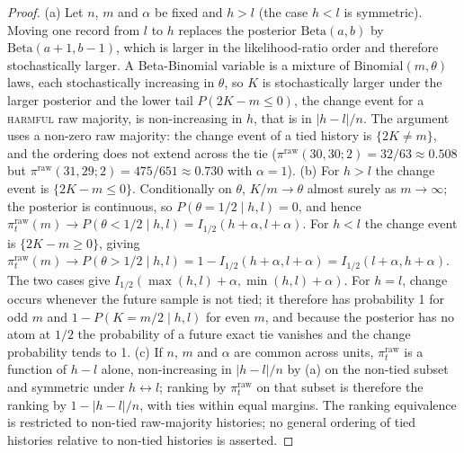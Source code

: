 \documentclass[11pt]{article}
\begin{document}
\begin{proof}
(a) Let $n$, $m$ and $\alpha$ be fixed and $h>l$ (the case $h<l$ is symmetric). Moving one record
from $l$ to $h$ replaces the posterior $\mathrm{Beta}(a,b)$ by $\mathrm{Beta}(a+1,b-1)$, which is
larger in the likelihood-ratio order and therefore stochastically larger. A Beta-Binomial
variable is a mixture of $\mathrm{Binomial}(m,\theta)$ laws, each stochastically increasing in
$\theta$, so $K$ is stochastically larger under the larger posterior and the lower tail
$P(2K-m\le0)$, the change event for a \textsc{harmful} raw majority, is non-increasing in $h$,
that is in $|h-l|/n$. The argument uses a non-zero raw majority: the change event of a tied history
is $\{2K\neq m\}$, and the ordering does not extend across the tie
($\pi^{\mathrm{raw}}(30,30;2)=32/63\approx0.508$ but $\pi^{\mathrm{raw}}(31,29;2)=475/651\approx0.730$
with $\alpha=1$).
(b) For $h>l$ the change event is $\{2K-m\le0\}$. Conditionally on $\theta$, $K/m\to\theta$ almost
surely as $m\to\infty$; the posterior is continuous, so $P(\theta=1/2\mid h,l)=0$, and hence
$\pi^{\mathrm{raw}}_t(m)\to P(\theta<1/2\mid h,l)=I_{1/2}(h+\alpha,l+\alpha)$. For $h<l$ the change
event is $\{2K-m\ge0\}$, giving $\pi^{\mathrm{raw}}_t(m)\to P(\theta>1/2\mid h,l)=1-I_{1/2}(h+\alpha,l+\alpha)=I_{1/2}(l+\alpha,h+\alpha)$.
The two cases give $I_{1/2}(\max(h,l)+\alpha,\min(h,l)+\alpha)$. For $h=l$, change occurs whenever
the future sample is not tied; it therefore has probability 1 for odd $m$ and $1-P(K=m/2\mid h,l)$
for even $m$, and because the posterior has no atom at $1/2$ the probability of a future exact tie
vanishes and the change probability tends to 1.
(c) If $n$, $m$ and $\alpha$ are common across units, $\pi^{\mathrm{raw}}_t$ is a function of $h-l$
alone, non-increasing in $|h-l|/n$ by (a) on the non-tied subset and symmetric under
$h\leftrightarrow l$; ranking by $\pi^{\mathrm{raw}}_t$ on that subset is therefore the ranking by
$1-|h-l|/n$, with ties within equal margins. The ranking equivalence is restricted to non-tied
raw-majority histories; no general ordering of tied histories relative to non-tied histories is
asserted.
\end{proof}
\end{document}
